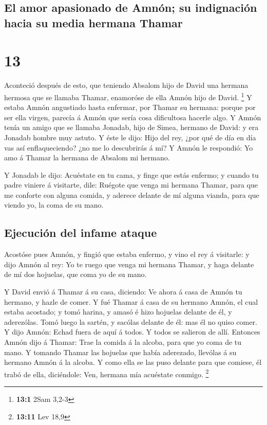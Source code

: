 \hypertarget{el-amor-apasionado-de-amnuxf3n-su-indignaciuxf3n-hacia-su-media-hermana-thamar}{%
\subsection{El amor apasionado de Amnón; su indignación hacia su media
hermana
Thamar}\label{el-amor-apasionado-de-amnuxf3n-su-indignaciuxf3n-hacia-su-media-hermana-thamar}}

\hypertarget{section-12}{%
\section{13}\label{section-12}}

 Aconteció después de esto, que teniendo Absalom hijo de
David una hermana hermosa que se llamaba Thamar, enamoróse de ella Amnón
hijo de David. \footnote{\textbf{13:1} 2Sam 3,2-3}  Y estaba
Amnón angustiado hasta enfermar, por Thamar su hermana: porque por ser
ella virgen, parecía á Amnón que sería cosa dificultosa hacerle algo.
 Y Amnón tenía un amigo que se llamaba Jonadab, hijo de
Simea, hermano de David: y era Jonadab hombre muy astuto.  Y
éste le dijo: Hijo del rey, ¿por qué de día en día vas así
enflaqueciendo? ¿no me lo descubrirás á mí? Y Amnón le respondió: Yo amo
á Thamar la hermana de Absalom mi hermano.

 Y Jonadab le dijo: Acuéstate en tu cama, y finge que estás
enfermo; y cuando tu padre viniere á visitarte, dile: Ruégote que venga
mi hermana Thamar, para que me conforte con alguna comida, y aderece
delante de mí alguna vianda, para que viendo yo, la coma de su mano.

\hypertarget{ejecuciuxf3n-del-infame-ataque}{%
\subsection{Ejecución del infame
ataque}\label{ejecuciuxf3n-del-infame-ataque}}

 Acostóse pues Amnón, y fingió que estaba enfermo, y vino el
rey á visitarle: y dijo Amnón al rey: Yo te ruego que venga mi hermana
Thamar, y haga delante de mí dos hojuelas, que coma yo de su mano.

 Y David envió á Thamar á su casa, diciendo: Ve ahora á casa
de Amnón tu hermano, y hazle de comer.  Y fué Thamar á casa
de su hermano Amnón, el cual estaba acostado; y tomó harina, y amasó é
hizo hojuelas delante de él, y aderezólas.  Tomó luego la
sartén, y sacólas delante de él: mas él no quiso comer. Y dijo Amnón:
Echad fuera de aquí á todos. Y todos se salieron de allí. 
Entonces Amnón dijo á Thamar: Trae la comida á la alcoba, para que yo
coma de tu mano. Y tomando Thamar las hojuelas que había aderezado,
llevólas á su hermano Amnón á la alcoba.  Y como ella se
las puso delante para que comiese, él trabó de ella, diciéndole: Ven,
hermana mía acuéstate conmigo. \footnote{\textbf{13:11} Lev 18,9}


